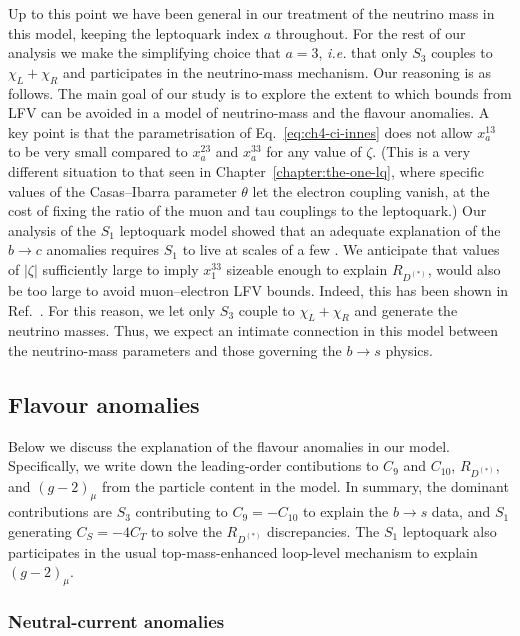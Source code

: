 Up to this point we have been general in our treatment of the neutrino mass in
this model, keeping the leptoquark index $a$ throughout. For the rest of our
analysis we make the simplifying choice that $a = 3$, \textit{i.e.} that only
$S_{3}$ couples to $\chi_{L} + \chi_{R}$ and participates in the neutrino-mass
mechanism. Our reasoning is as follows. The main goal of our study is to explore
the extent to which bounds from LFV can be avoided in a model of neutrino-mass
and the flavour anomalies. A key point is that the parametrisation of
Eq.~\eqref{eq:ch4-ci-innes} does not allow $x_{a}^{13}$ to be very small
compared to $x_a^{23}$ and $x_a^{33}$ for any value of $\zeta$. (This is a very
different situation to that seen in Chapter~\ref{chapter:the-one-lq}, where
specific values of the Casas--Ibarra parameter $\theta$ let the electron
coupling vanish, at the cost of fixing the ratio of the muon and tau couplings
to the leptoquark.) Our analysis of the $S_{1}$ leptoquark model showed that an
adequate explanation of the $b \to c$ anomalies requires $S_{1}$ to live at
scales of a few \TeV. We anticipate that values of $|\zeta|$ sufficiently large
to imply $x_{1}^{33}$ sizeable enough to explain $R_{D^{(*)}}$, would also be
too large to avoid muon--electron LFV bounds. Indeed, this has been shown in
Ref.~\cite{Bigaran:2019bqv}. For this reason, we let only $S_{3}$ couple to
$\chi_{L} + \chi_{R}$ and generate the neutrino masses. Thus, we expect an
intimate connection in this model between the neutrino-mass parameters and those
governing the $b \to s$ physics.

\subsection{Flavour anomalies}
\label{sec:ch4-innes-anomalies}

Below we discuss the explanation of the flavour anomalies in our model.
Specifically, we write down the leading-order contibutions to $C_{9}$ and
$C_{10}$, $R_{D^{(*)}}$, and $(g-2)_\mu$ from the particle content in the model.
In summary, the dominant contributions are $S_{3}$ contributing to
$C_{9} = - C_{10}$ to explain the $b \to s$ data, and $S_{1}$ generating
$C_{S} = - 4 C_{T}$ to solve the $R_{D^{(*)}}$ discrepancies. The
$S_{1}$ leptoquark also participates in the usual top-mass-enhanced loop-level
mechanism to explain $(g - 2)_{\mu}$.

\subsubsection{Neutral-current anomalies}

